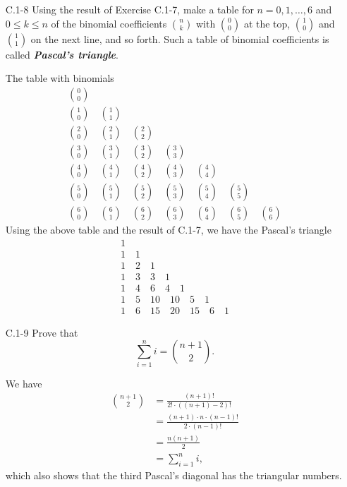\begin{enumerate}
\item[C.1{-}8] {Using the result of Exercise C.1-7, make a table for
$n = 0, 1, \dots, 6$ and $0 \le k \le n$ of the binomial coefficients
$\binom{n}{k}$ with $\binom{0}{0}$ at the top, $\binom{1}{0}$ and $\binom{1}{1}$
on the next line, and so forth. Such a table of binomial coefficients is called
\textbf{\emph{Pascal's triangle}}.}

\begin{framed}
The table with binomials
\begin{gather*}
  \binom{0}{0}\\
  \binom{1}{0} \quad \binom{1}{1}\\
  \binom{2}{0} \quad \binom{2}{1} \quad \binom{2}{2}\\
  \binom{3}{0} \quad \binom{3}{1} \quad \binom{3}{2} \quad \binom{3}{3}\\
  \binom{4}{0} \quad \binom{4}{1} \quad \binom{4}{2} \quad \binom{4}{3} \quad \binom{4}{4}\\
  \binom{5}{0} \quad \binom{5}{1} \quad \binom{5}{2} \quad \binom{5}{3} \quad \binom{5}{4} \quad \binom{5}{5}\\
  \binom{6}{0} \quad \binom{6}{1} \quad \binom{6}{2} \quad \binom{6}{3} \quad \binom{6}{4} \quad \binom{6}{5} \quad \binom{6}{6}
\end{gather*}
Using the above table and the result of C.1-7, we have the Pascal's triangle
\begin{gather*}
  1\\
  1 \quad 1\\
  1 \quad 2 \quad 1\\
  1 \quad 3 \quad 3 \quad 1\\
  1 \quad 4 \quad 6 \quad 4 \quad 1\\
  1 \quad 5 \quad 10 \quad 10 \quad 5 \quad 1\\
  1 \quad 6 \quad 15 \quad 20 \quad 15 \quad 6 \quad 1
\end{gather*}
\end{framed}

\item[C.1{-}9] {Prove that
\[
  \sum_{i = 1}^{n} i = \binom{n + 1}{2}.
\]
}

\begin{framed}
We have
\begin{equation*}
\begin{aligned}
  \binom{n + 1}{2} &= \frac{(n + 1)!}{2! \cdot ((n + 1) - 2)!}\\
                   &= \frac{(n + 1) \cdot n \cdot (n - 1)!}{2 \cdot (n - 1)!}\\
                   &= \frac{n (n + 1)}{2}\\
                   &= \sum_{i = 1}^{n} i,
\end{aligned}
\end{equation*}
which also shows that the third Pascal's diagonal has the triangular numbers.
\end{framed}


\end{enumerate}

